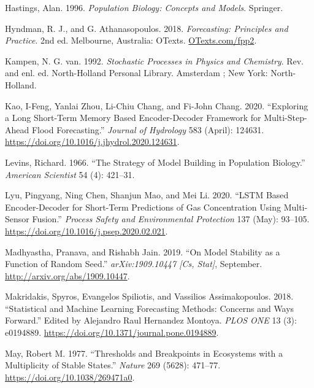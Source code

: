 \documentclass{article}
\newlength{\cslhangindent}
\newlength{\cslentryspacingunit} %
\newenvironment{CSLReferences}[2] %
 {%
  \setlength{\parindent}{0pt}
  \ifodd #1
  \let\oldpar\par
  \def\par{\hangindent=\cslhangindent\oldpar}
  \fi
  \setlength{\parskip}{#2\cslentryspacingunit}
 }%
 {}
\begin{document}
\begin{CSLReferences}{1}{0}
\leavevmode{}%
Hastings, Alan. 1996. \emph{Population {Biology}: {Concepts} and
{Models}}. Springer.

\leavevmode{}%
Hyndman, R. J., and G. Athanasopoulos. 2018. \emph{Forecasting:
Principles and Practice}. 2nd ed. Melbourne, Australia: OTexts.
\href{https://OTexts.com/fpp2}{OTexts.com/fpp2}.

\leavevmode{}%
Kampen, N. G. van. 1992. \emph{Stochastic Processes in Physics and
Chemistry}. Rev. and enl. ed. North-{Holland} Personal Library.
Amsterdam ; New York: North-Holland.

\leavevmode{}%
Kao, I-Feng, Yanlai Zhou, Li-Chiu Chang, and Fi-John Chang. 2020.
{``Exploring a {Long} {Short}-{Term} {Memory} Based {Encoder}-{Decoder}
Framework for Multi-Step-Ahead Flood Forecasting.''} \emph{Journal of
Hydrology} 583 (April): 124631.
\url{https://doi.org/10.1016/j.jhydrol.2020.124631}.

\leavevmode{}%
Levins, Richard. 1966. {``The Strategy of Model Building in Population
Biology.''} \emph{American Scientist} 54 (4): 421--31.

\leavevmode{}%
Lyu, Pingyang, Ning Chen, Shanjun Mao, and Mei Li. 2020. {``{LSTM} Based
Encoder-Decoder for Short-Term Predictions of Gas Concentration Using
Multi-Sensor Fusion.''} \emph{Process Safety and Environmental
Protection} 137 (May): 93--105.
\url{https://doi.org/10.1016/j.psep.2020.02.021}.

\leavevmode{}%
Madhyastha, Pranava, and Rishabh Jain. 2019. {``On {Model} {Stability}
as a {Function} of {Random} {Seed}.''} \emph{arXiv:1909.10447 {[}Cs,
Stat{]}}, September. \url{http://arxiv.org/abs/1909.10447}.

\leavevmode{}%
Makridakis, Spyros, Evangelos Spiliotis, and Vassilios Assimakopoulos.
2018. {``Statistical and {Machine} {Learning} Forecasting Methods:
{Concerns} and Ways Forward.''} Edited by Alejandro Raul Hernandez
Montoya. \emph{PLOS ONE} 13 (3): e0194889.
\url{https://doi.org/10.1371/journal.pone.0194889}.

\leavevmode{}%
May, Robert M. 1977. {``Thresholds and Breakpoints in Ecosystems with a
Multiplicity of Stable States.''} \emph{Nature} 269 (5628): 471--77.
\url{https://doi.org/10.1038/269471a0}.


\end{CSLReferences}
\end{document}
